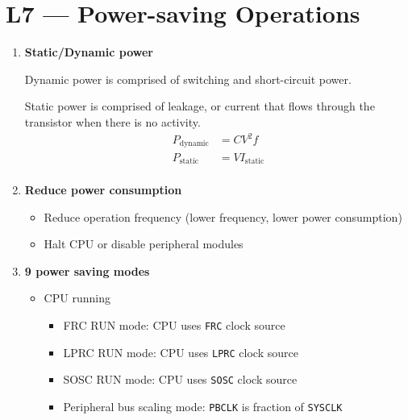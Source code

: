 \documentclass[a4paper]{article}
\begin{document}
\section*{L7 --- Power-saving Operations}
  \begin{enumerate}[label = \arabic*.]
    \item \textbf{Static/Dynamic power}
      \par Dynamic power is comprised of switching and short-circuit power.
      \par Static power is comprised of leakage, or current that flows through the transistor when there is no activity.
      \begin{equation*}
        \begin{aligned}
          P_{\text{dynamic}} & = C V^2 f             \\
          P_{\text{static}}  & = V I_{\text{static}} \\
        \end{aligned}
      \end{equation*}

    \item \textbf{Reduce power consumption}
      \begin{itemize}[leftmargin = 1cm]
        \item Reduce operation frequency (lower frequency, lower power consumption)
        \item Halt CPU or disable peripheral modules
      \end{itemize}

    \item \textbf{9 power saving modes}
      \begin{itemize}[leftmargin = 1cm]
        \item CPU running
          \begin{itemize}[leftmargin = 1cm]
            \item FRC RUN mode: CPU uses \verb|FRC| clock source
            \item LPRC RUN mode: CPU uses \verb|LPRC| clock source
            \item SOSC RUN mode: CPU uses \verb|SOSC| clock source
            \item Peripheral bus scaling mode: \verb|PBCLK| is fraction of \verb|SYSCLK|
          \end{itemize}


\end{itemize}
\end{enumerate}
\end{document}
